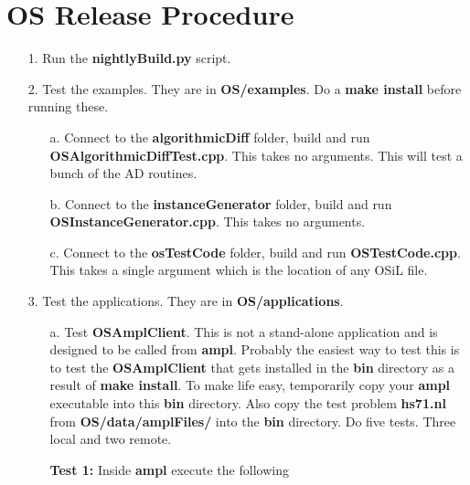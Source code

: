 \section{OS Release Procedure}\label{section:ReleaseProcedure} 

\begin{itemize}

\item[1.] Run the {\bf nightlyBuild.py} script.

\item[2.] Test the examples.  They are in {\bf OS/examples}.  Do a {\bf make install} before running these.

\begin{itemize}

\item[a.]  Connect to the {\bf algorithmicDiff} folder, build and run {\bf OSAlgorithmicDiffTest.cpp}.  This takes no arguments.  This will test a bunch of the AD routines.



\item[b.]  Connect to the {\bf instanceGenerator} folder, build and run {\bf OSInstanceGenerator.cpp}.  This takes no arguments.

\item[c.]  Connect to the {\bf osTestCode} folder, build and run {\bf OSTestCode.cpp}.  This takes a single argument which is the location of any OSiL file.


\end{itemize}

\item[3.] Test the applications.  They are in {\bf OS/applications}.

\begin{itemize}
 
 
 \item[a.]  Test {\bf OSAmplClient}.  This is not a stand-alone application and is designed to be called from  {\bf ampl}.   Probably the easiest way to test this is to test the {\bf OSAmplClient}  that gets installed in the {\bf bin} directory as a result of {\bf make install}. To make life easy, temporarily copy your {\bf ampl} executable into this {\bf bin} directory.   Also copy the test problem {\bf hs71.nl}  from {\bf OS/data/amplFiles/} into the {\bf bin} directory.   Do five tests. Three local and two remote.
 
 
 \vskip 10pt
 
 
 {\bf Test 1:}  Inside  {\bf ampl} execute the following
 



\end{itemize}
\end{itemize}
